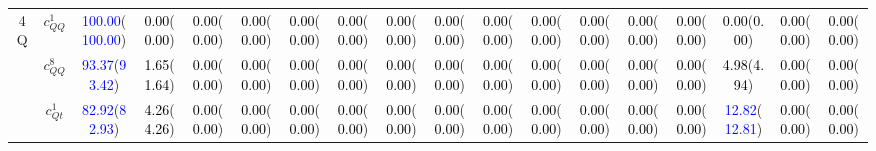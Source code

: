 \documentclass{article}
\begin{document}
\begin{landscape}
\begin{table}[H]
\begin{tabular}{|c|c|c|c|c|c|c|c|c|c|c|c|c|c|c|c|c|c|}
\multirow{5}{*}{4Q}
 & $c_{QQ}^{1}$ & \textcolor{blue}{100.00}(\textcolor{blue}{100.00}) & \textcolor{black}{0.00}(\textcolor{black}{0.00}) & \textcolor{black}{0.00}(\textcolor{black}{0.00}) & \textcolor{black}{0.00}(\textcolor{black}{0.00}) & \textcolor{black}{0.00}(\textcolor{black}{0.00}) & \textcolor{black}{0.00}(\textcolor{black}{0.00}) & \textcolor{black}{0.00}(\textcolor{black}{0.00}) & \textcolor{black}{0.00}(\textcolor{black}{0.00}) & \textcolor{black}{0.00}(\textcolor{black}{0.00}) & \textcolor{black}{0.00}(\textcolor{black}{0.00}) & \textcolor{black}{0.00}(\textcolor{black}{0.00}) & \textcolor{black}{0.00}(\textcolor{black}{0.00}) & \textcolor{black}{0.00}(\textcolor{black}{0.00}) & \textcolor{black}{0.00}(\textcolor{black}{0.00}) & \textcolor{black}{0.00}(\textcolor{black}{0.00}) & \textcolor{black}{0.00}(\textcolor{black}{0.00})\\ \cline{2-18}
 & $c_{QQ}^{8}$ & \textcolor{blue}{93.37}(\textcolor{blue}{93.42}) & \textcolor{black}{1.65}(\textcolor{black}{1.64}) & \textcolor{black}{0.00}(\textcolor{black}{0.00}) & \textcolor{black}{0.00}(\textcolor{black}{0.00}) & \textcolor{black}{0.00}(\textcolor{black}{0.00}) & \textcolor{black}{0.00}(\textcolor{black}{0.00}) & \textcolor{black}{0.00}(\textcolor{black}{0.00}) & \textcolor{black}{0.00}(\textcolor{black}{0.00}) & \textcolor{black}{0.00}(\textcolor{black}{0.00}) & \textcolor{black}{0.00}(\textcolor{black}{0.00}) & \textcolor{black}{0.00}(\textcolor{black}{0.00}) & \textcolor{black}{0.00}(\textcolor{black}{0.00}) & \textcolor{black}{0.00}(\textcolor{black}{0.00}) & \textcolor{black}{4.98}(\textcolor{black}{4.94}) & \textcolor{black}{0.00}(\textcolor{black}{0.00}) & \textcolor{black}{0.00}(\textcolor{black}{0.00})\\ \cline{2-18}
 & $c_{Qt}^{1}$ & \textcolor{blue}{82.92}(\textcolor{blue}{82.93}) & \textcolor{black}{4.26}(\textcolor{black}{4.26}) & \textcolor{black}{0.00}(\textcolor{black}{0.00}) & \textcolor{black}{0.00}(\textcolor{black}{0.00}) & \textcolor{black}{0.00}(\textcolor{black}{0.00}) & \textcolor{black}{0.00}(\textcolor{black}{0.00}) & \textcolor{black}{0.00}(\textcolor{black}{0.00}) & \textcolor{black}{0.00}(\textcolor{black}{0.00}) & \textcolor{black}{0.00}(\textcolor{black}{0.00}) & \textcolor{black}{0.00}(\textcolor{black}{0.00}) & \textcolor{black}{0.00}(\textcolor{black}{0.00}) & \textcolor{black}{0.00}(\textcolor{black}{0.00}) & \textcolor{black}{0.00}(\textcolor{black}{0.00}) & \textcolor{blue}{12.82}(\textcolor{blue}{12.81}) & \textcolor{black}{0.00}(\textcolor{black}{0.00}) & \textcolor{black}{0.00}(\textcolor{black}{0.00})\\ \cline{2-18}

\end{tabular}
\end{table}
\end{landscape}
\end{document}
